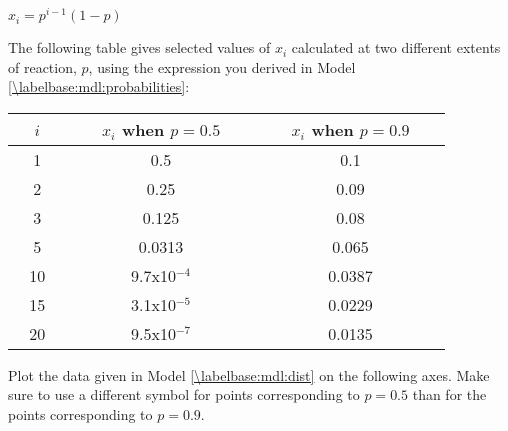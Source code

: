 \begin{activity}
\begin{ctqs}
		\begin{solution}[0.5in]
		
			$x_i = p^{i-1}(1-p)$
			
		\end{solution}
		
\end{ctqs}

\begin{model}
\label{\labelbase:mdl:dist}

	The following table gives selected values of $x_i$ calculated at two different extents of reaction, $p$, using the expression you derived in Model \ref{\labelbase:mdl:probabilities}:
	
		\begin{center}
			\renewcommand{\arraystretch}{1.5}
			\begin{tabular}{ccc}
				\hline
				\textbf{~~$i$~~} & ~~~$x_i$ when $p=0.5$~~~ & ~~~$x_i$ when $p=0.9$~~~ \\\hline
				1 & 0.5 & 0.1 \\
				2 & 0.25 & 0.09 \\
				3 & 0.125 & 0.08 \\
				5 & 0.0313 & 0.065 \\
				10 & 9.7x10$^{-4}$ & 0.0387 \\
				15 & 3.1x10$^{-5}$ & 0.0229 \\
				20 & 9.5x10$^{-7}$ & 0.0135 \\\hline
			\end{tabular}
		\end{center}
		
		\vspace{0.1in}

\end{model}
	
\begin{ctqs}

	\question Plot the data given in Model \ref{\labelbase:mdl:dist} on the following axes.  Make sure to use a different symbol for points corresponding to $p=0.5$ than for the points corresponding to $p=0.9$.
	
		\begin{solution}[3.25in]
		\end{solution}
	

\end{ctqs}
\end{activity}
